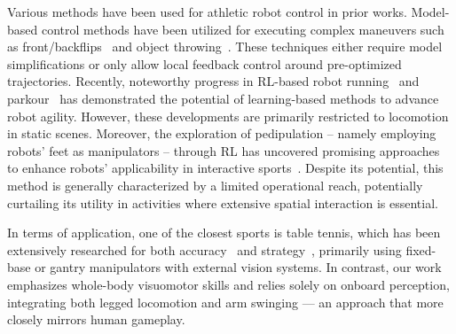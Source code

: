 \documentclass[9pt,twocolumn,twoside]{osajnl}
\begin{document}
Various methods have been used for athletic robot control in prior works. Model-based control methods have been utilized for executing complex maneuvers such as front/backflips~\cite{raibert1986legged,le2024fast,katz2019mini} and object throwing~\cite{liu2024tube,chiu2022collision}. These techniques either require model simplifications or only allow local feedback control around pre-optimized trajectories. Recently, noteworthy progress in \ac{RL}-based robot running~\cite{crowley2023optimizing, ji2022concurrent, margolis2024rapid,he2024agile} and parkour~\cite{hoeller2024anymal, cheng2023extreme, zhuang2023robot, caluwaerts2023barkour} has demonstrated the potential of learning-based methods to advance robot agility. However, these developments are primarily restricted to locomotion in static scenes. Moreover, the exploration of pedipulation -- namely employing robots' feet as manipulators -- through \ac{RL} has uncovered promising approaches to enhance robots' applicability in interactive sports~\cite{ji2023dribblebot, haarnoja2024soccer}. Despite its potential, this method is generally characterized by a limited operational reach, potentially curtailing its utility in activities where extensive spatial interaction is essential.

In terms of application, one of the closest sports is table tennis, which has been extensively researched for both accuracy~\cite{d2024achieving, ding2022learning, ma2023reinforcement} and strategy~\cite{abeyruwan2023sim2real, d2024achieving}, primarily using fixed-base or gantry manipulators with external vision systems. In contrast, our work emphasizes whole-body visuomotor skills and relies solely on onboard perception, integrating both legged locomotion and arm swinging — an approach that more closely mirrors human gameplay.
\end{document}
